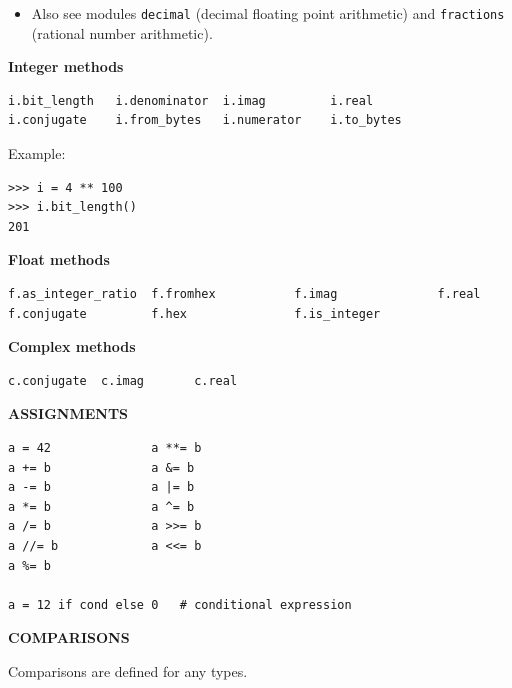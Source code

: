 \documentclass[9pt,a4wide]{extarticle}
\begin{document}
\begin{itemize}
\item Also see modules {\tt decimal} (decimal floating point arithmetic) and
   {\tt fractions} (rational number arithmetic).
\end{itemize}


\bigskip
{\LARGE\bf Integer methods}

\begin{verbatim}
i.bit_length   i.denominator  i.imag         i.real         
i.conjugate    i.from_bytes   i.numerator    i.to_bytes    
\end{verbatim}

Example:

\begin{verbatim}
>>> i = 4 ** 100
>>> i.bit_length()
201
\end{verbatim}


\bigskip
{\LARGE\bf Float methods}

\begin{verbatim}
f.as_integer_ratio  f.fromhex           f.imag              f.real              
f.conjugate         f.hex               f.is_integer        
\end{verbatim}



\bigskip
{\LARGE\bf Complex methods}

\begin{verbatim}
c.conjugate  c.imag       c.real
\end{verbatim}




\bigskip
{\LARGE\bf ASSIGNMENTS}


\begin{verbatim}
a = 42              a **= b  
a += b              a &= b
a -= b              a |= b
a *= b              a ^= b
a /= b              a >>= b
a //= b             a <<= b
a %= b

a = 12 if cond else 0   # conditional expression
\end{verbatim}




\bigskip
{\LARGE\bf COMPARISONS}

\medskip

Comparisons are defined for any types.

\medskip
\end{document}
